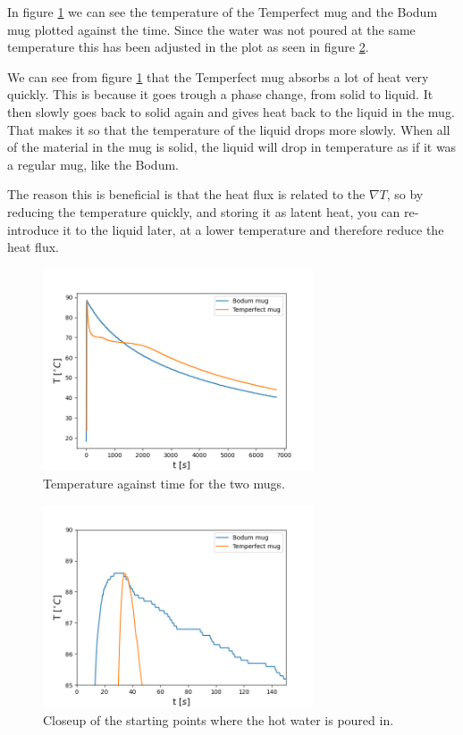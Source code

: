 \documentclass[reprint,english,notitlepage]{revtex4-1}  %
\begin{document}
In figure \ref{fig:mugs} we can see the temperature of the Temperfect mug and the Bodum mug plotted against the time. Since the water was not poured at the same temperature this has been adjusted in the plot as seen in figure \ref{fig:mugs_2}. 

We can see from figure \ref{fig:mugs} that the Temperfect mug absorbs a lot of heat very quickly. This is because it goes trough a phase change, from solid to liquid. It then slowly goes back to solid again and gives heat back to the liquid in the mug. That makes it so that the temperature of the liquid drops more slowly. When all of the material in the mug is solid, the liquid will drop in temperature as if it was a regular mug, like the Bodum.

The reason this is beneficial is that the heat flux is related to the $\nabla T$, so by reducing the temperature quickly, and storing it as latent heat, you can re-introduce it to the liquid later, at a lower temperature and therefore reduce the heat flux.



\begin{figure}
\centering
\includegraphics[width=8cm]{../figures/mugs.png}
\caption{Temperature against time for the two mugs.}
\label{fig:mugs}
\end{figure}

\begin{figure}
\centering
\includegraphics[width=8cm]{../figures/mugs_2.png}
\caption{Closeup of the starting points where the hot water is poured in.}
\label{fig:mugs_2}
\end{figure}
\end{document}
